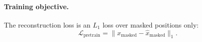 \documentclass{article}
\begin{document}
\paragraph{Training objective.}
The reconstruction loss is an $L_1$ loss over masked positions only:
\[
\mathcal{L}_{\text{pretrain}} = \| x_{\text{masked}} - \hat{x}_{\text{masked}} \|_1.
\]

%
%
%
\end{document}
